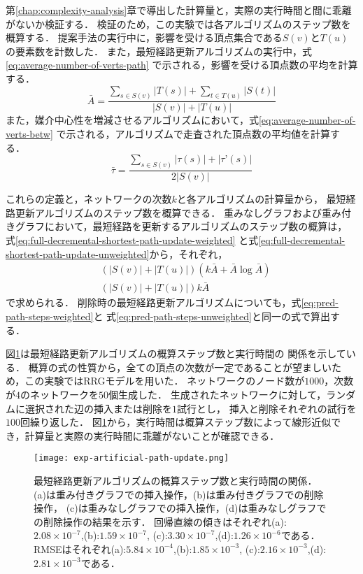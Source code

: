 第\ref{chap:complexity-analysis}章で導出した計算量と，実際の実行時間と間に乖離がないか検証する．
検証のため，この実験では各アルゴリズムのステップ数を概算する．
提案手法の実行中に，影響を受ける頂点集合である$S(v)$と$T(u)$の要素数を計数した．
また，最短経路更新アルゴリズムの実行中，式\eqref{eq:average-number-of-verts-path}
で示される，影響を受ける頂点数の平均を計算する．
\begin{equation}
  \bar{A}=\frac{\sum_{s\in S(v)}|T(s)|+\sum_{t\in T(u)}|S(t)|}{|S(v)|+|T(u)|}
  \label{eq:average-number-of-verts-path}
\end{equation}
また，媒介中心性を増減させるアルゴリズムにおいて，式\eqref{eq:average-number-of-verts-betw}
で示される，アルゴリズムで走査された頂点数の平均値を計算する．
\begin{equation}
  \bar{\tau}=\frac{\sum_{s\in S(v)}|\tau(s)|+|\tau’(s)|}{2|S(v)|}
  \label{eq:average-number-of-verts-betw}
\end{equation}

これらの定義と，ネットワークの次数$k$と各アルゴリズムの計算量から，
最短経路更新アルゴリズムのステップ数を概算できる．
重みなしグラフおよび重み付きグラフにおいて，最短経路を更新するアルゴリズムのステップ数の概算は，
式\eqref{eq:full-decremental-shortest-path-update-weighted}
と式\eqref{eq:full-decremental-shortest-path-update-unweighted}から，それぞれ，
\begin{align}
  &(|S(v)|+|T(u)|)(k\bar{A}+\bar{A}\log\bar{A})
  \label{eq:pred-path-steps-weighted} \\
  &(|S(v)|+|T(u)|)k\bar{A}
  \label{eq:pred-path-steps-unweighted}
\end{align}
で求められる．
削除時の最短経路更新アルゴリズムについても，式\ref{eq:pred-path-steps-weighted}と
式\ref{eq:pred-path-steps-unweighted}と同一の式で算出する．

図\ref{fig:exp-artificial-path-update}は最短経路更新アルゴリズムの概算ステップ数と実行時間の
関係を示している．
概算の式の性質から，全ての頂点の次数が一定であることが望ましいため，この実験ではRRGモデルを用いた．
ネットワークのノード数が$1000$，次数が$4$のネットワークを$50$個生成した．
生成されたネットワークに対して，ランダムに選択された辺の挿入または削除を$1$試行とし，
挿入と削除それぞれの試行を$100$回繰り返した．
図\ref{fig:exp-artificial-path-update}から，実行時間は概算ステップ数によって線形近似でき，計算量と実際の実行時間に乖離がないことが確認できる．

\begin{figure}
  \centering
  \texttt{[image: exp-artificial-path-update.png]}
  \caption{
    最短経路更新アルゴリズムの概算ステップ数と実行時間の関係．
    (a)は重み付きグラフでの挿入操作，(b)は重み付きグラフでの削除操作，
    (c)は重みなしグラフでの挿入操作，(d)は重みなしグラフでの削除操作の結果を示す．
    回帰直線の傾きはそれぞれ(a):$2.08\times10^{-7}$,(b):$1.59\times10^{-7}$,
    (c):$3.30\times10^{-7}$,(d):$1.26\times10^{-6}$である．
    RMSEはそれぞれ(a):$5.84\times10^{-4}$,(b):$1.85\times10^{-3}$,
    (c):$2.16\times10^{-3}$,(d):$2.81\times10^{-3}$である．
  }
  \label{fig:exp-artificial-path-update}
\end{figure}

